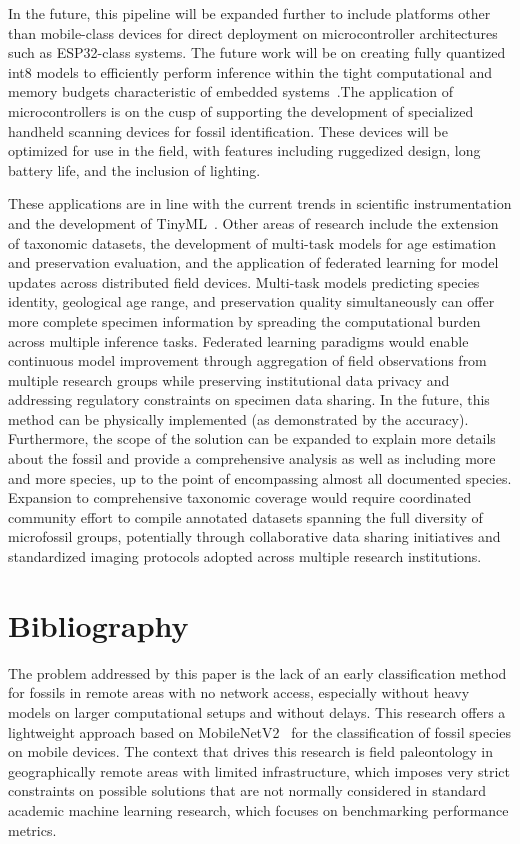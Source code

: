 \documentclass[a4paper,fleqn]{cas-sc}
\begin{document}
In the future, this pipeline will be expanded further to include platforms other than mobile-class devices for direct deployment on microcontroller architectures such as ESP32-class systems. The future work will be on creating fully quantized int8 models to efficiently perform inference within the tight computational and memory budgets characteristic of embedded systems~\cite{warden2019tinyml}.The application of microcontrollers is on the cusp of supporting the development of specialized handheld scanning devices for fossil identification. These devices will be optimized for use in the field, with features including ruggedized design, long battery life, and the inclusion of lighting.

These applications are in line with the current trends in scientific instrumentation and the development of TinyML~\cite{warden2019tinyml}. Other areas of research include the extension of taxonomic datasets, the development of multi-task models for age estimation and preservation evaluation, and the application of federated learning for model updates across distributed field devices. Multi-task models predicting species identity, geological age range, and preservation quality simultaneously can offer more complete specimen information by spreading the computational burden across multiple inference tasks. Federated learning paradigms would enable continuous model improvement through aggregation of field observations from multiple research groups while preserving institutional data privacy and addressing regulatory constraints on specimen data sharing. In the future, this method can be physically implemented (as demonstrated by the accuracy). Furthermore, the scope of the solution can be expanded to explain more details about the fossil and provide a comprehensive analysis as well as including more and more species, up to the point of encompassing almost all documented species. Expansion to comprehensive taxonomic coverage would require coordinated community effort to compile annotated datasets spanning the full diversity of microfossil groups, potentially through collaborative data sharing initiatives and standardized imaging protocols adopted across multiple research institutions.

\FloatBarrier

\section{Bibliography}

The problem addressed by this paper is the lack of an early classification method for fossils in remote areas with no network access, especially without heavy models on larger computational setups and without delays. This research offers a lightweight approach based on MobileNetV2~\cite{sandler2018mobilenetv2} for the classification of fossil species on mobile devices. The context that drives this research is field paleontology in geographically remote areas with limited infrastructure, which imposes very strict constraints on possible solutions that are not normally considered in standard academic machine learning research, which focuses on benchmarking performance metrics.
\end{document}

